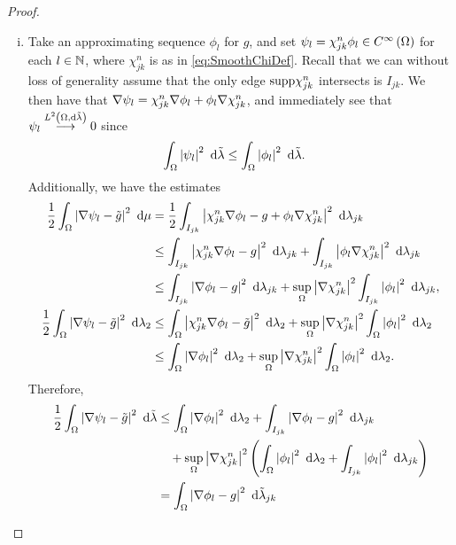 \begin{proof}
	\begin{enumerate}[(i)]
		\item Take an approximating sequence $\phi_l$ for $g$, and set $\psi_l = \chi_{jk}^n\phi_l\in C^{\infty}\left( \Omega \right)$ for each $l\in\mathbb{N}$, where $\chi_{jk}^n$ is as in \eqref{eq:SmoothChiDef}.
		Recall that we can without loss of generality assume that the only edge $\mathrm{supp}\chi_{jk}^n$ intersects is $I_{jk}$.
		We then have that $\nabla\psi_l = \chi_{jk}^n\nabla\phi_l + \phi_l\nabla\chi_{jk}^n$, and immediately see that $\psi_l\overset{L^{2}\left( \Omega,\mathrm{d}\tilde{\lambda} \right)}{\longrightarrow}0$ since
		\begin{align*}
			\int_{\Omega}\left\lvert  \psi_l  \right\rvert^2 \ \mathrm{d}\tilde{\lambda}
			&\leq \int_{\Omega}\left\lvert  \phi_l  \right\rvert^2 \ \mathrm{d}\tilde{\lambda}.
		\end{align*}
		Additionally, we have the estimates
		\begin{align*}
			\frac{1}{2}\int_{\Omega}\left\lvert  \nabla\psi_l - \tilde{g}  \right\rvert^2 \ \mathrm{d}\mu
			&= \frac{1}{2}\int_{I_{jk}}\left\lvert  \chi_{jk}^n\nabla\phi_l - g  + \phi_l\nabla\chi_{jk}^n  \right\rvert^2 \ \mathrm{d}\lambda_{jk} \\
			&\leq \int_{I_{jk}}\left\lvert  \chi_{jk}^n\nabla\phi_l - g  \right\rvert^2 \ \mathrm{d}\lambda_{jk}
			+ \int_{I_{jk}}\left\lvert  \phi_l\nabla\chi_{jk}^n  \right\rvert^2 \ \mathrm{d}\lambda_{jk} \\
			&\leq \int_{I_{jk}}\left\lvert  \nabla\phi_l - g  \right\rvert^2 \ \mathrm{d}\lambda_{jk}
			+ \sup_{\Omega}\left\lvert \nabla\chi_{jk}^n \right\rvert^2 \int_{I_{jk}}\left\lvert  \phi_l  \right\rvert^2 \ \mathrm{d}\lambda_{jk}, \\
			\frac{1}{2}\int_{\Omega}\left\lvert  \nabla\psi_l - \tilde{g}  \right\rvert^2 \ \mathrm{d}\lambda_2
			&\leq \int_{\Omega}\left\lvert  \chi_{jk}^n\nabla\phi_l - \tilde{g}  \right\rvert^2 \ \mathrm{d}\lambda_2
			+ \sup_{\Omega}\left\lvert \nabla\chi_{jk}^n \right\rvert^2 \int_{\Omega}\left\lvert  \phi_l  \right\rvert^2 \ \mathrm{d}\lambda_2 \\
			&\leq \int_{\Omega}\left\lvert  \nabla\phi_l  \right\rvert^2 \ \mathrm{d}\lambda_2
			+ \sup_{\Omega}\left\lvert \nabla\chi_{jk}^n \right\rvert^2 \int_{\Omega}\left\lvert  \phi_l  \right\rvert^2 \ \mathrm{d}\lambda_2.
		\end{align*}
		Therefore,
		\begin{align*}
			\recip{2}\integral{\ddom}{\abs{ \grad\psi_l - \tilde{g} }^2}{\compMes}
			&\leq \integral{\ddom}{\abs{ \grad\phi_l }^2}{\lambda_2}
			+ \integral{I_{jk}}{\abs{ \grad\phi_l - g }^2}{\lambda_{jk}} \\
			&\quad + \sup_{\ddom}\abs{\grad\chi_{jk}^n}^2 
			\bracs{ \integral{\ddom}{\abs{ \phi_l }^2}{\lambda_2} 	+ \integral{I_{jk}}{\abs{ \phi_l }^2}{\lambda_{jk}} } \\
			&= \integral{\ddom}{\abs{ \grad\phi_l - g }^2}{\compMes_{jk}}

\end{align*}
\end{enumerate}
\end{proof}
